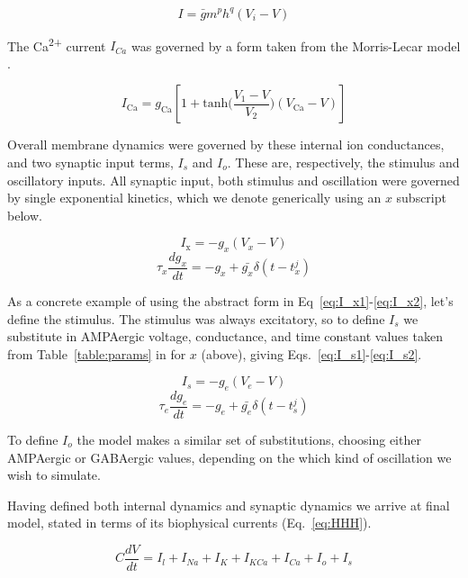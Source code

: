 \documentclass{article}
\begin{document}
\begin{equation}
\label{eq:Idef}
I = \bar{g} m^p h^q (V_i - V)
\end{equation}

The Ca\textsuperscript{2+} current $I_{Ca}$ was governed by a form taken from the Morris-Lecar model \cite{Morris1981,LeMasson1993,Siegel1994}.

\begin{equation}
I_\text{Ca} = g_\text{Ca} [1 + \text{tanh} \Big ( \frac{V_1 - V}{ V_2} \Big ) (V_\text{Ca} - V)]
\end{equation}

Overall membrane dynamics were governed by these internal ion conductances, and two synaptic input terms, $I_s$ and $I_o$. These are, respectively, the stimulus and oscillatory inputs. All synaptic input, both stimulus and oscillation were governed by single exponential kinetics, which we denote generically using an $x$ subscript below.

\begin{equation}
    \label{eq:I_x1}
    I_{\text{x}} = -g_x (V_x - V)
\end{equation}
\begin{equation}
    \label{eq:I_x2}
    \tau_x \frac{dg_x}{dt} = -g_x + \bar{g_x} \delta(t - t_x^j)
\end{equation}

As a concrete example of using the abstract form in Eq~\ref{eq:I_x1}-\ref{eq:I_x2}, let's define the stimulus. The stimulus was always excitatory, so to define $I_s$ we substitute in AMPAergic voltage, conductance, and time constant values taken from Table~\ref{table:params} in for $x$ (above), giving Eqs.~\ref{eq:I_s1}-\ref{eq:I_s2}. 

\begin{equation}
    \label{eq:I_s1}
    I_{s} = -g_e (V_e - V)
\end{equation}
\begin{equation}
    \label{eq:I_s2}
    \tau_e \frac{dg_e}{dt} = -g_e + \bar{g_e} \delta(t - t_s^j)
\end{equation}

To define $I_o$ the model makes a similar set of substitutions, choosing either AMPAergic or GABAergic values, depending on the which kind of oscillation we wish to simulate.

Having defined both internal dynamics and synaptic dynamics we arrive at final model, stated in terms of its biophysical currents (Eq.~\ref{eq:HHH}).

\begin{equation}
\label{eq:HHH}
C \frac{dV}{dt} = I_l + I_{Na} + I_{K} + I_{KCa} + I_{Ca} + I_{o} + I_{s} 
\end{equation}
\end{document}
